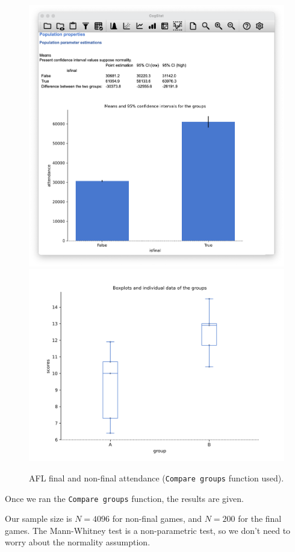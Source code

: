 \documentclass[
  11pt,
  a4paper,
  twoside,symmetric,openright]{book}
\theoremstyle{break}
\theoremstyle{break}
\begin{document}
\begin{figure}

{\centering \includegraphics[width=0.6\linewidth]{resources/image/mannwhitneyafl24} \includegraphics[width=0.6\linewidth]{resources/image/mannwhitneyafl24box} 

}

\caption{AFL final and non-final attendance (\texttt{Compare\ groups} function used).}\label{fig:mwafl24}
\end{figure}

Once we ran the \texttt{Compare\ groups} function, the results are given.

Our sample size is \(N=4096\) for non-final games, and \(N=200\) for the final games. The Mann-Whitney test is a non-parametric test, so we don't need to worry about the normality assumption.
\end{document}
